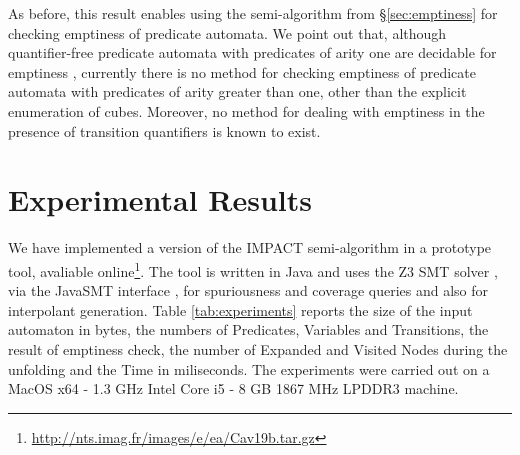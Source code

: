 As before, this result enables using the
semi-algorithm from \S\ref{sec:emptiness} for checking emptiness of
predicate automata.  We point out that, although quantifier-free
predicate automata with predicates of arity one are decidable for
emptiness \cite{Farzan15}, currently there is no method for checking
emptiness of predicate automata with predicates of arity greater than
one, other than the explicit enumeration of cubes. Moreover, no method
for dealing with emptiness in the presence of transition quantifiers
is known to exist.
\fi

\section{Experimental Results}

We have implemented a version of the IMPACT semi-algorithm
\cite{McMillan06} in a prototype tool, avaliable
online\footnote{\url{http://nts.imag.fr/images/e/ea/Cav19b.tar.gz}}. The
tool is written in Java and uses the Z3 SMT solver \cite{z3}, via the
JavaSMT interface \cite{javasmt}, for spuriousness and coverage
queries and also for interpolant generation. Table
\ref{tab:experiments} reports the size of the input automaton in
bytes, the numbers of Predicates, Variables and Transitions, the
result of emptiness check, the number of Expanded and Visited Nodes
during the unfolding and the Time in miliseconds.  The experiments
were carried out on a MacOS x64 - 1.3 GHz Intel Core i5 - 8 GB 1867
MHz LPDDR3 machine.

